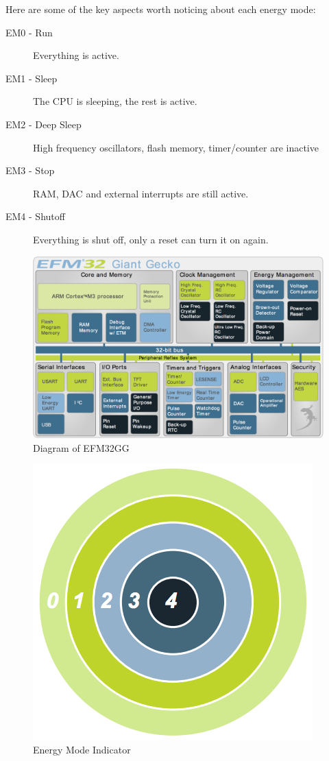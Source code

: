 Here are some of the key aspects worth noticing about each energy mode:

\begin{description}
  \item[EM0 - Run] Everything is active.
  \item[EM1 - Sleep] The CPU is sleeping, the rest is active.
  \item[EM2 - Deep Sleep] High frequency oscillators, flash memory, timer/counter are inactive
  \item[EM3 - Stop] RAM, DAC and external interrupts are still active.
  \item[EM4 - Shutoff] Everything is shut off, only a reset can turn it on again.
\end{description}

\begin{figure}[h]
\centering
\includegraphics[scale=0.6]{images/em.png}
\caption{Diagram of EFM32GG}
\label{fig:em}
\end{figure}

\begin{figure}[h]
\centering
\includegraphics[scale=0.6]{images/em_numbers.png}
\caption{Energy Mode Indicator}
\label{fig:em2}
\end{figure}

